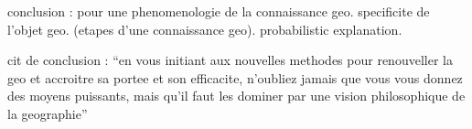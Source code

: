 conclusion : pour une phenomenologie de la connaissance geo. specificite de l'objet geo. (etapes d'une connaissance geo). probabilistic explanation. 

cit de conclusion :
``en vous initiant aux nouvelles methodes pour renouveller la geo et accroitre sa portee et son efficacite, n'oubliez jamais que vous vous donnez des moyens puissants, mais qu'il faut les dominer par une vision philosophique de la geographie''


















